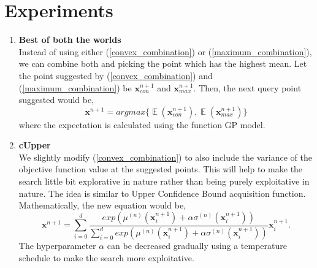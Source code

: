 \documentclass{article}
\DeclareMathOperator*{\E}{\mathbb{E}}
\begin{document}
\section{Experiments}
    \begin{enumerate}
        \item
            \textbf {Best of both the worlds} \\
            Instead of using either (\ref{convex_combination}) or (\ref{maximum_combination}), we can combine both and picking the point which has the highest
            mean. Let the point suggested by (\ref{convex_combination}) and (\ref{maximum_combination}) be $\textbf{x}^{n+1}_{con}$ and 
            $\textbf{x}^{n+1}_{max}$. Then, the next query point suggested would be,
            \begin{equation}
                \textbf{x}^{n+1} = arg max \{\E(\textbf{x}^{n+1}_{con}), \E(\textbf{x}^{n+1}_{max})\}
            \end{equation}
            where the expectation is calculated using the function GP model.

        \item
            \textbf {cUpper} \\
            We slightly modify (\ref{convex_combination}) to also include the variance of the objective function value at the suggested points. This will help
            to make the search little bit explorative in nature rather than being purely exploitative in nature. The idea is similar to Upper Confidence Bound 
            acquisition function. Mathematically, the new equation would be,
            \begin{equation}
                \textbf {x}^{n+1} = \sum_{i=0}^{d} \frac {exp(\mu^{(n)}(\textbf{x}^{n+1}_{i})+\alpha\sigma^{(n)}(\textbf{x}^{n+1}_{i}) )}{\sum_{i=0}^{d} exp(\mu^{(n)}(\textbf{x}^{n+1}_{i})+\alpha\sigma^{(n)}(\textbf{x}^{n+1}_{i}))} \textbf{x}^{n+1}_{i}.
                \label{cUpper_combination}
            \end{equation}
            The hyperparameter $\alpha$ can be decreased gradually using a temperature schedule to make the search more exploitative.


\end{enumerate}
\end{document}
